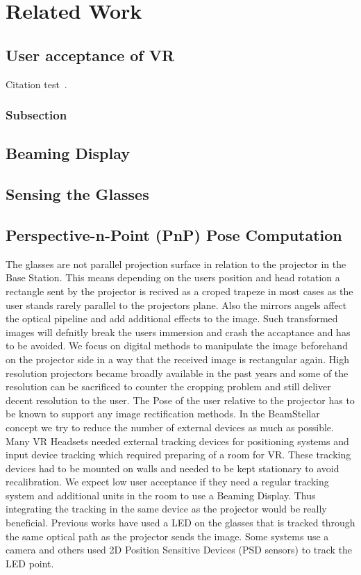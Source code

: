 
\chapter{Related Work}\label{chapter:related_work}

\section{User acceptance of VR}
Citation test~\parencite{latex}.

\subsection{Subsection}
\section{Beaming Display}
\section{Sensing the Glasses}
\section{Perspective-n-Point (PnP) Pose Computation}
The glasses are not parallel projection surface in relation to the projector in the Base Station.
This means depending on the users position and head rotation a rectangle sent by the projector is recived as a croped trapeze in most cases as the user stands rarely parallel to the projectors plane.
Also the mirrors angels affect the optical pipeline and add additional effects to the image.
Such transformed images will defnitly break the users immersion and crash the accaptance and has to be avoided.
We focus on digital methods to manipulate the image beforehand on the projector side in a way that the received image is rectangular again.
High resolution projectors became broadly available in the past years and some of the resolution can be sacrificed to counter the cropping problem and still deliver decent resolution to the user.
The Pose of the user relative to the projector has to be known to support any image rectification methods.
In the BeamStellar concept we try to reduce the number of external devices as much as possible.
Many VR Headsets needed external tracking devices for positioning systems and input device tracking which required preparing of a room for VR.
These tracking devices had to be mounted on walls and needed to be kept stationary to avoid recalibration.
We expect low user acceptance if they need a regular tracking system and additional units in the room to use a Beaming Display.
Thus integrating the tracking in the same device as the projector would be really beneficial.
Previous works have used a LED on the glasses that is tracked through the same optical path as the projector sends the image.
Some systems use a camera and others used 2D Position Sensitive Devices (PSD sensors) to track the LED point.


